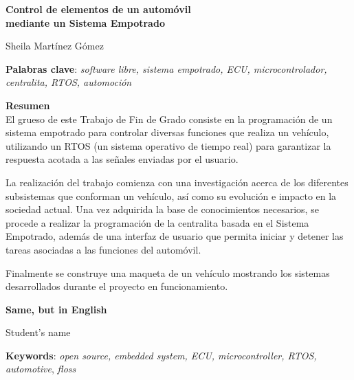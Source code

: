 \thispagestyle{empty}

\begin{center}
{\large\bfseries Control de elementos de un automóvil \\ mediante un Sistema Empotrado }\\
\end{center}
\begin{center}
Sheila Martínez Gómez\\
\end{center}


\vspace{0.5cm}
\noindent\textbf{Palabras clave}: \textit{software libre, sistema empotrado, ECU, microcontrolador, centralita, RTOS, automoción}
\vspace{0.7cm}

\noindent\textbf{Resumen}\\

El grueso de este Trabajo de Fin de Grado consiste en la programación de un sistema empotrado para controlar diversas funciones que realiza un vehículo, utilizando un RTOS (un sistema operativo de tiempo real) para garantizar la respuesta acotada a las señales enviadas por el usuario.\newline

La realización del trabajo comienza con una investigación acerca de los diferentes subsistemas que conforman un vehículo, así como su evolución e impacto en la sociedad actual. Una vez adquirida la base de conocimientos necesarios, se procede a realizar la programación de la centralita basada en el Sistema Empotrado, además de una interfaz de usuario que permita iniciar y detener las tareas asociadas a las funciones del automóvil.\newline

Finalmente se construye una maqueta de un vehículo mostrando los sistemas desarrollados durante el proyecto en funcionamiento.\newline

\cleardoublepage

\begin{center}
	{\large\bfseries Same, but in English}\\
\end{center}
\begin{center}
	Student's name\\
\end{center}
\vspace{0.5cm}
\noindent\textbf{Keywords}: \textit{open source, embedded system, ECU, microcontroller, RTOS, automotive}, \textit{floss}
\vspace{0.7cm}

